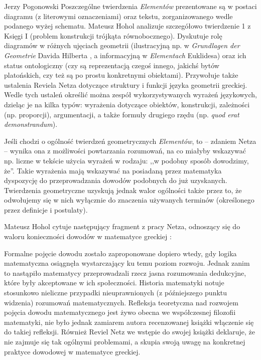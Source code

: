 \begin{newrevengenv}{Jerzy Pogonowski}
Poszczególne twierdzenia {\em Elementów} prezentowane są w postaci
diagramu (z literowymi oznaczeniami) oraz tekstu, zorganizowanego
wedle podanego wyżej schematu. Mateusz Hohol analizuje szczegółowo
twierdzenie 1 z Księgi I (problem konstrukcji trójkąta
równobocznego). Dyskutuje rolę diagramów w różnych ujęciach
geometrii (ilustracyjną np. w {\em Grundlagen der Geometrie}
Davida Hilberta \parencite{hilbert_grundlagen_1899}, a informacyjną w {\em Elementach}
Euklidesa) oraz ich status ontologiczny (czy są reprezentacją
czegoś innego, jakichś bytów platońskich, czy też są po prostu
konkretnymi obiektami). Przywołuje także ustalenia Reviela Netza
dotyczące struktury i funkcji języka geometrii greckiej. Wedle
tych ustaleń określić można zespół wykorzystywanych wyrażeń
językowych, dzieląc je na kilka typów: wyrażenia dotyczące
obiektów, konstrukcji, zależności (np. proporcji), argumentacji, a
także formuły drugiego rzędu (np. {\em quod erat demonstrandum}).

Jeśli chodzi o ogólność twierdzeń geometrycznych {\em Elementów},
to -- zdaniem Netza -- wynika ona z możliwości powtarzania
rozumowań, na co miałyby wskazywać np. liczne w tekście użycia
wyrażeń w rodzaju: ,,w podobny sposób dowodzimy, że''. Takie
wyrażenia mają wskazywać na posiadaną przez matematyka dyspozycję
do przeprowadzania dowodów podobnych do już uzyskanych.
Twierdzenia geometryczne uzyskują jednak walor ogólności także
przez to, że odwołujemy się w nich wyłącznie do znaczenia
używanych terminów (określonego przez definicje i postulaty).

Mateusz Hohol cytuje następujący fragment z pracy Netza, odnoszący
się do waloru konieczności dowodów w matematyce greckiej \parencite[s. 215]{netz_shaping_1999}:


Formalne pojęcie dowodu zostało zaproponowane dopiero wtedy, gdy
logika matematyczna osiągnęła wystarczający ku temu poziom
rozwoju. Jednak zanim to nastąpiło matematycy przeprowadzali rzecz
jasna rozumowania dedukcyjne, które były akceptowane w ich
społeczności. Historia matematyki notuje stosunkowo nieliczne
przypadki nieuprawnionych (z późniejszego punktu widzenia)
rozumowań matematycznych. Refleksja teoretyczna nad rozwojem
pojęcia dowodu matematycznego jest żywo obecna we współczesnej
filozofii matematyki, nie było jednak zamiarem autora recenzowanej
książki włączenie się do takiej refleksji. Również Reviel Netz we
wstępie do swojej książki deklaruje, że nie zajmuje się tak
ogólnymi problemami, a skupia swoją uwagę na konkretnej praktyce
dowodowej w matematyce greckiej.


\end{newrevengenv}
